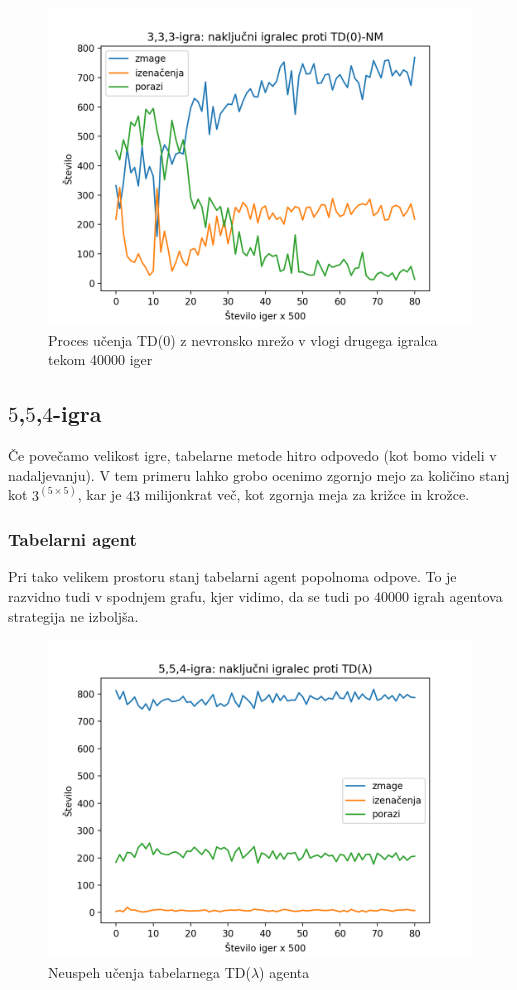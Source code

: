 \documentclass[12pt,a4paper]{amsart}
\theoremstyle{definition} %
\theoremstyle{plain} %
\begin{document}
\begin{figure}[H]
    \includegraphics[scale=0.8]{../rezultati/tdnn-333-40000-2.png}
    \caption{Proces učenja TD($0$) z nevronsko mrežo v vlogi drugega igralca tekom 40000 iger}
\end{figure}

\subsection{$5$,$5$,$4$-igra}
Če povečamo velikost igre, tabelarne metode hitro odpovedo (kot bomo videli v nadaljevanju). V tem 
primeru lahko grobo ocenimo zgornjo mejo za količino stanj kot $3 ^ {(5 \times 5)}$, kar je $43$ 
milijonkrat več, kot zgornja meja za križce in krožce. 

\subsubsection{Tabelarni agent}
Pri tako velikem prostoru stanj tabelarni agent popolnoma odpove. To je razvidno tudi v spodnjem grafu, 
kjer vidimo, da se tudi po $40000$ igrah agentova strategija ne izboljša.

\begin{figure}[H]
    \includegraphics[scale=0.8]{../rezultati/tdl-554-40000-2.png}
    \caption{Neuspeh učenja tabelarnega TD($\lambda$) agenta}
\end{figure}
\end{document}

